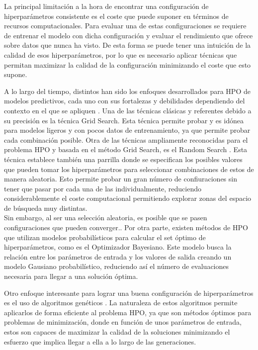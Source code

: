 \documentclass{uathesis-es}
\begin{document}
La principal limitación a la hora de encontrar una configuración de hiperparámetros consistente es el coste que puede suponer en términos de recursos computacionales. Para evaluar una de estas configuraciones se requiere de entrenar el modelo con dicha configuración y evaluar el rendimiento que ofrece sobre datos que nunca ha visto. De esta forma se puede tener una intuición de la calidad de esos hiperparámetros, por lo que es necesario aplicar técnicas que permitan maximizar la calidad de la configuración minimizando el coste que esto supone.


A lo largo del tiempo, distintos han sido los enfoques desarrollados para HPO de modelos predictivos, cada uno con sus fortalezas y debilidades dependiendo del contexto en el que se apliquen \cite{yu2020hyperparameter}. Una de las técnicas clásicas y referentes debido a su precisión es la técnica Grid Search. Esta técnica permite probar y es idónea para modelos ligeros y con pocos datos de entrenamiento, ya que permite probar cada combinación posible. Otra de las técnicas ampliamente reconocidas para el problema HPO y basada en el método Grid Search, es el Random Search \cite{bergstra2012random}. Esta técnica establece también una parrilla donde se especifican los posibles valores que pueden tomar los hiperparámetros para seleccionar combinaciones de estos de manera aleatoria. Esto permite probar un gran número de confiuraciones sin tener que pasar por cada una de las individualmente, reduciendo considerablemente el coste computacional permitiendo explorar zonas del espacio de búsqueda muy distintas.\\ 
Sin embargo, al ser una selección aleatoria, es posible que se pasen configuraciones que pueden converger.. Por otra parte, existen métodos de HPO que utilizan modelos probabilísticos para calcular el set óptimo de hiperparámetros, como es el Optimizador Bayesiano. Este modelo busca la relación entre los parámetros de entrada y los valores de salida creando un modelo Gausiano probabilístico, reduciendo así el número de evaluaciones necesaria para llegar a una solución óptima.

Otro enfoque interesante para lograr una buena configuración de hiperparámetros es el uso de algoritmos genéticos \cite{alibrahim2021hyperparameter}. La naturaleza de estos algoritmos permite aplicarlos de forma eficiente al problema HPO, ya que son métodos óptimos para problemas de minimización, donde en función de unos parámetros de entrada, estos son capaces de maximizar la calidad de la soluciones minimizando el esfuerzo que implica llegar a ella a lo largo de las generaciones.
\end{document}
